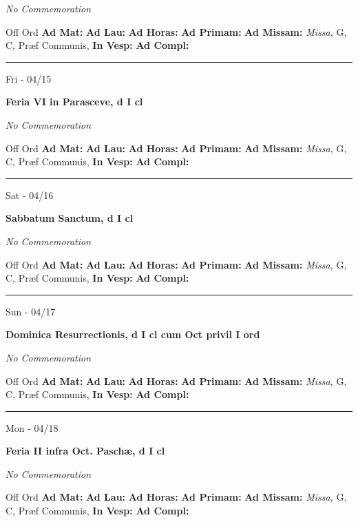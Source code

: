 \documentclass[letterpaper, 10pt]{article}
\begin{document}
\textit{No Commemoration}\begin{justify}
Off Ord
\textbf{Ad Mat: }
\textbf{Ad Lau: }
\textbf{Ad Horas: }
\textbf{Ad Primam: }
\textbf{Ad Missam:} \textit{Missa, } G, C, Præf Communis, 
\textbf{In Vesp: }
\textbf{Ad Compl: }\end{justify}



\hrule
\begin{center}
Fri - 04/15
\end{center}\textbf{ \large Feria VI in Parasceve, \textnormal{\normalsize d I cl}}

\textit{No Commemoration}\begin{justify}
Off Ord
\textbf{Ad Mat: }
\textbf{Ad Lau: }
\textbf{Ad Horas: }
\textbf{Ad Primam: }
\textbf{Ad Missam:} \textit{Missa, } G, C, Præf Communis, 
\textbf{In Vesp: }
\textbf{Ad Compl: }\end{justify}



\hrule
\begin{center}
Sat - 04/16
\end{center}\textbf{ \large Sabbatum Sanctum, \textnormal{\normalsize d I cl}}

\textit{No Commemoration}\begin{justify}
Off Ord
\textbf{Ad Mat: }
\textbf{Ad Lau: }
\textbf{Ad Horas: }
\textbf{Ad Primam: }
\textbf{Ad Missam:} \textit{Missa, } G, C, Præf Communis, 
\textbf{In Vesp: }
\textbf{Ad Compl: }\end{justify}



\hrule
\begin{center}
Sun - 04/17
\end{center}\textbf{ \large Dominica Resurrectionis, \textnormal{\normalsize d I cl cum Oct privil I ord}}

\textit{No Commemoration}\begin{justify}
Off Ord
\textbf{Ad Mat: }
\textbf{Ad Lau: }
\textbf{Ad Horas: }
\textbf{Ad Primam: }
\textbf{Ad Missam:} \textit{Missa, } G, C, Præf Communis, 
\textbf{In Vesp: }
\textbf{Ad Compl: }\end{justify}



\hrule
\begin{center}
Mon - 04/18
\end{center}\textbf{ \large Feria II infra Oct. Paschæ, \textnormal{\normalsize d I cl}}

\textit{No Commemoration}\begin{justify}
Off Ord
\textbf{Ad Mat: }
\textbf{Ad Lau: }
\textbf{Ad Horas: }
\textbf{Ad Primam: }
\textbf{Ad Missam:} \textit{Missa, } G, C, Præf Communis, 
\textbf{In Vesp: }
\textbf{Ad Compl: }\end{justify}
\end{document}
